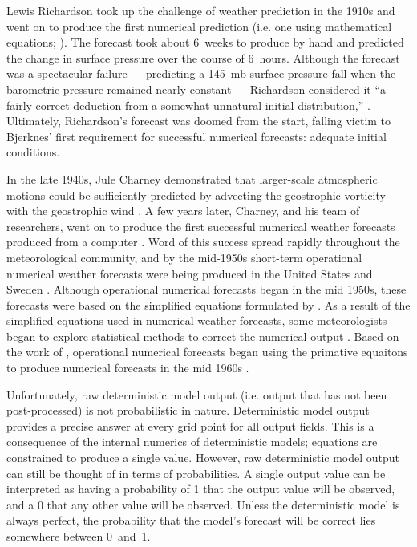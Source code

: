 Lewis Richardson took up the challenge of weather prediction in the 1910s and went on to produce the first numerical prediction (i.e. one using mathematical equations; \citealp{Lynch2008}).
The forecast took about \mbox{6 weeks} to produce by hand and predicted the change in surface pressure over the course of \mbox{6 hours}.
Although the forecast was a spectacular failure --- predicting a \mbox{145 mb} surface pressure fall when the barometric pressure remained nearly constant --- Richardson considered it ``a fairly correct deduction from a somewhat unnatural initial distribution,'' \citep{Lynch2008}.
Ultimately, Richardson's forecast was doomed from the start, falling victim to Bjerknes' first requirement for successful numerical forecasts: adequate initial conditions.


In the late 1940s, Jule Charney demonstrated that larger-scale atmospheric motions could be sufficiently predicted by advecting the geostrophic vorticity with the geostrophic wind \citep{Charney1947}.
A few years later, Charney, and his team of researchers, went on to produce the first successful numerical weather forecasts produced from a computer \citep{Charney1950}.
Word of this success spread rapidly throughout the meteorological community, and by the mid-1950s short-term operational numerical weather forecasts were being produced in the United States and Sweden \citep{Lewis2005}.
Although operational numerical forecasts began in the mid 1950s, these forecasts were based on the simplified equations formulated by \cite{Charney1947}.
As a result of the simplified equations used in numerical weather forecasts, some meteorologists began to explore statistical methods to correct the numerical output \citep{Gleeson1961}.
Based on the work of \cite{Hinkelmann1951}, operational numerical forecasts began using the primative equaitons to produce numerical forecasts in the mid 1960s \citep{Lynch2008}.


Unfortunately, raw deterministic model output (i.e. output that has not been post-processed) is not probabilistic in nature.
Deterministic model output provides a precise answer at every grid point for all output fields.
This is a consequence of the internal numerics of deterministic models; equations are constrained to produce a single value.
However, raw deterministic model output can still be thought of in terms of probabilities.
A single output value can be interpreted as having a probability of 1 that the output value will be observed, and a 0 that any other value will be observed.
Unless the deterministic model is always perfect, the probability that the model's forecast will be correct lies somewhere between \mbox{0 and 1}.


